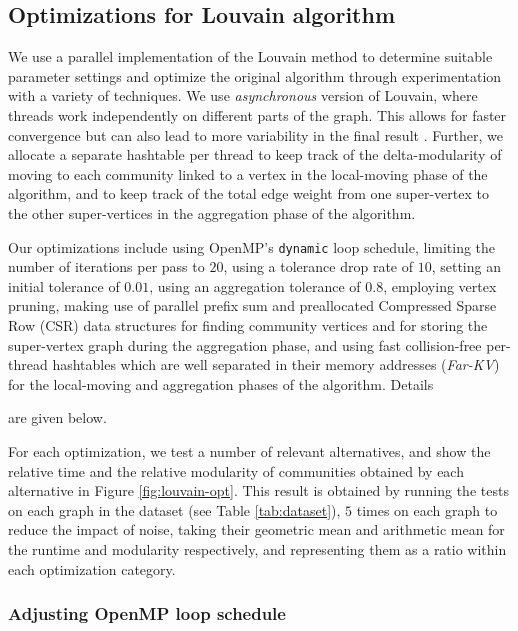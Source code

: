 \subsection{Optimizations for Louvain algorithm}
\label{sec:louvain}

We use a parallel implementation of the Louvain method to determine suitable parameter settings and optimize the original algorithm through experimentation with a variety of techniques. We use \textit{asynchronous} version of Louvain, where threads work independently on different parts of the graph. This allows for faster convergence but can also lead to more variability in the final result \cite{com-blondel08, com-halappanavar17}. Further, we allocate a separate hashtable per thread to keep track of the delta-modularity of moving to each community linked to a vertex in the local-moving phase of the algorithm, and to keep track of the total edge weight from one super-vertex to the other super-vertices in the aggregation phase of the algorithm.

Our optimizations include using OpenMP's \verb|dynamic| loop schedule, limiting the number of iterations per pass to $20$, using a tolerance drop rate of $10$, setting an initial tolerance of $0.01$, using an aggregation tolerance of $0.8$, employing vertex pruning, making use of parallel prefix sum and preallocated Compressed Sparse Row (CSR) data structures for finding community vertices and for storing the super-vertex graph during the aggregation phase, and using fast collision-free per-thread hashtables which are well separated in their memory addresses (\textit{Far-KV}) for the local-moving and aggregation phases of the algorithm. Details are given below.

For each optimization, we test a number of relevant alternatives, and show the relative time and the relative modularity of communities obtained by each alternative in Figure \ref{fig:louvain-opt}. This result is obtained by running the tests on each graph in the dataset (see Table \ref{tab:dataset}), $5$ times on each graph to reduce the impact of noise, taking their geometric mean and arithmetic mean for the runtime and modularity respectively, and representing them as a ratio within each optimization category.


\subsubsection{Adjusting OpenMP loop schedule}

